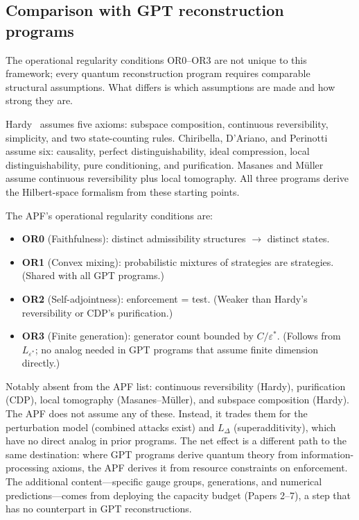 \documentclass[11pt]{article}
\newenvironment{varlist}{\begin{itemize}[nosep,leftmargin=2em]}{\end{itemize}}
\begin{document}
\subsection{Comparison with GPT reconstruction programs}

The operational regularity conditions OR0--OR3 are not unique to this framework; every quantum reconstruction program requires comparable structural assumptions.  What differs is which assumptions are made and how strong they are.

Hardy~\cite{Hardy2001} assumes five axioms: subspace composition, continuous reversibility, simplicity, and two state-counting rules.  Chiribella, D'Ariano, and Perinotti~\cite{CDP2011} assume six: causality, perfect distinguishability, ideal compression, local distinguishability, pure conditioning, and purification.  Masanes and M\"uller~\cite{MM2011} assume continuous reversibility plus local tomography.  All three programs derive the Hilbert-space formalism from these starting points.

The APF's operational regularity conditions are:
\begin{varlist}
\item \textbf{OR0} (Faithfulness): distinct admissibility structures $\to$ distinct states.
\item \textbf{OR1} (Convex mixing): probabilistic mixtures of strategies are strategies. (Shared with all GPT programs.)
\item \textbf{OR2} (Self-adjointness): enforcement = test.  (Weaker than Hardy's reversibility or CDP's purification.)
\item \textbf{OR3} (Finite generation): generator count bounded by $C/\varepsilon^*$. (Follows from $L_{\varepsilon^*}$; no analog needed in GPT programs that assume finite dimension directly.)
\end{varlist}

Notably absent from the APF list: continuous reversibility (Hardy), purification (CDP), local tomography (Masanes--M\"uller), and subspace composition (Hardy).  The APF does not assume any of these.  Instead, it trades them for the perturbation model (combined attacks exist) and $L_\Delta$ (superadditivity), which have no direct analog in prior programs.  The net effect is a different path to the same destination: where GPT programs derive quantum theory from information-processing axioms, the APF derives it from resource constraints on enforcement.  The additional content---specific gauge groups, generations, and numerical predictions---comes from deploying the capacity budget (Papers 2--7), a step that has no counterpart in GPT reconstructions.
\end{document}
